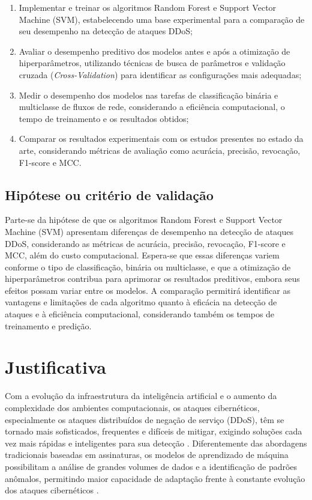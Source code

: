 \documentclass[
    12pt,                %
    openright,           %
    oneside,             %
    a4paper,             %
    english,             %
    brazil               %
]{abntex2}
\begin{document}
\begin{enumerate}
    \item Implementar e treinar os algoritmos Random Forest e Support Vector Machine (SVM), estabelecendo uma base experimental para a comparação de seu desempenho na detecção de ataques DDoS;
    \item Avaliar o desempenho preditivo dos modelos antes e após a otimização de hiperparâmetros, utilizando técnicas de busca de parâmetros e validação cruzada (\textit{Cross-Validation}) para identificar as configurações mais adequadas;
    \item Medir o desempenho dos modelos nas tarefas de classificação binária e multiclasse de fluxos de rede, considerando a eficiência computacional, o tempo de treinamento e os resultados obtidos;
    \item Comparar os resultados experimentais com os estudos presentes no estado da arte, considerando métricas de avaliação como acurácia, precisão, revocação, F1-score e MCC.
\end{enumerate}


\subsection{Hipótese ou critério de validação}

Parte-se da hipótese de que os algoritmos Random Forest e Support Vector Machine (SVM) apresentam diferenças de desempenho na detecção de ataques DDoS, considerando as métricas de acurácia, precisão, revocação, F1-score e MCC, além do custo computacional. Espera-se que essas diferenças variem conforme o tipo de classificação, binária ou multiclasse, e que a otimização de hiperparâmetros contribua para aprimorar os resultados preditivos, embora seus efeitos possam variar entre os modelos. A comparação permitirá identificar as vantagens e limitações de cada algoritmo quanto à eficácia na detecção de ataques e à eficiência computacional, considerando também os tempos de treinamento e predição. 

\section{Justificativa}
\label{sec:justificativa}

Com a evolução da infraestrutura da inteligência artificial e o aumento da complexidade dos ambientes computacionais, os ataques cibernéticos, especialmente os ataques distribuídos de negação de serviço (DDoS), têm se tornado mais sofisticados, frequentes e difíceis de mitigar, exigindo soluções cada vez mais rápidas e inteligentes para sua detecção \cite{thaqi2026}. Diferentemente das abordagens tradicionais baseadas em assinaturas, os modelos de aprendizado de máquina possibilitam a análise de grandes volumes de dados e a identificação de padrões anômalos, permitindo maior capacidade de adaptação frente à constante evolução dos ataques cibernéticos \cite{ouhssini2024}.
\end{document}
